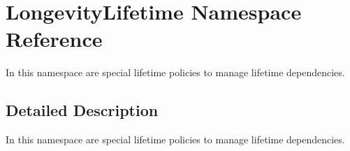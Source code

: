\hypertarget{namespaceLongevityLifetime}{}\section{Longevity\+Lifetime Namespace Reference}
\label{namespaceLongevityLifetime}


In this namespace are special lifetime policies to manage lifetime dependencies.  




\subsection{Detailed Description}
In this namespace are special lifetime policies to manage lifetime dependencies. 